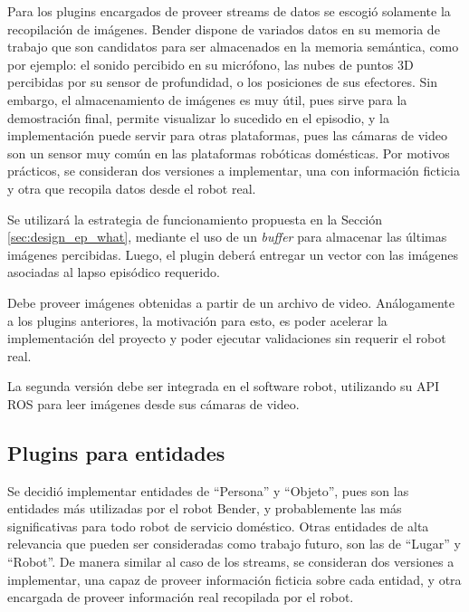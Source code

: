 Para los plugins encargados de proveer streams de datos se escogió solamente la recopilación de imágenes. Bender dispone de variados datos en su memoria de trabajo que son candidatos para ser almacenados en la memoria semántica, como por ejemplo: el sonido percibido en su micrófono, las nubes de puntos 3D percibidas por su sensor de profundidad, o los posiciones de sus efectores. Sin embargo, el almacenamiento de imágenes es muy útil, pues sirve para la demostración final, permite visualizar lo sucedido en el episodio, y la implementación puede servir para otras plataformas, pues las cámaras de video son un sensor muy común en las plataformas robóticas domésticas. Por motivos prácticos, se consideran dos versiones a implementar, una con información ficticia y otra que recopila datos desde el robot real.

Se utilizará la estrategia de funcionamiento propuesta en la Sección \ref{sec:design_ep_what}, mediante el uso de un \textit{buffer} para almacenar las últimas imágenes percibidas. Luego, el plugin deberá entregar un vector con las imágenes asociadas al lapso episódico requerido.

Debe proveer imágenes obtenidas a partir de un archivo de video. Análogamente a los plugins anteriores, la motivación para esto, es poder acelerar la implementación del proyecto y poder ejecutar validaciones sin requerir el robot real.

La segunda versión debe ser integrada en el software robot, utilizando su API ROS para leer imágenes desde sus cámaras de video.

\subsection{Plugins para entidades}

Se decidió implementar entidades de ``Persona'' y ``Objeto'', pues son las entidades más utilizadas por el robot Bender, y probablemente las más significativas para todo robot de servicio doméstico. Otras entidades de alta relevancia que pueden ser consideradas como trabajo futuro, son las de ``Lugar'' y ``Robot''. De manera similar al caso de los streams, se consideran dos versiones a implementar, una capaz de proveer información ficticia sobre cada entidad, y otra encargada de proveer información real recopilada por el robot.

